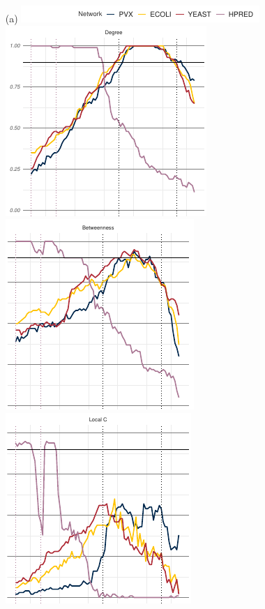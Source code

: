 \begin{figure}
    \begin{enumerate}
        \item[(a)] \includegraphics[scale=1.02]{plot_relaxed_similarity_papertop.pdf}\\
        \includegraphics[scale=1.02,trim={0 0.8mm 0 0},clip]{plot_relaxed_similarity_paper_degree.pdf}\hspace*{0.2mm}\includegraphics[scale=1.02,trim={0 0.3mm 0 0},clip]{plot_relaxed_similarity_paper_betweenness.pdf}\hspace*{-0.45mm}\includegraphics[scale=1.02,trim={0 0.8mm 0 0},clip]{plot_relaxed_similarity_paper_localc.pdf}\\

\end{enumerate}
\end{figure}
